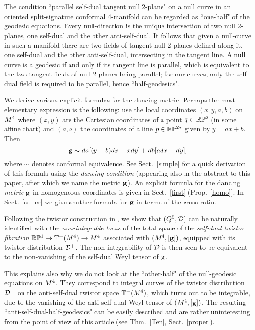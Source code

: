 The   condition ``parallel  self-dual tangent null 2-plane" on a null curve in an oriented  split-signature conformal 4-manifold can be regarded as ``one-half" of  the  geodesic equations. Every null-direction  is the unique intersection of two null 2-planes, one self-dual and the other anti-self-dual. It follows that given a null-curve in such a manifold  there are  two fields of tangent null 2-planes defined along it, one self-dual and the other anti-self-dual, intersecting in the tangent line. A null  curve is a geodesic if and only if its tangent line is parallel, which  is equivalent to the two  tangent fields of null 2-planes being  parallel; for our curves, only the self-dual field   is required to be parallel, hence ``half-geodesics".  

We derive various explicit formulas for the dancing metric. Perhaps the most elementary expression is the following: use the local coordinates $(x,y,a,b)$ on $M^4$ where  $(x,y)$ are the Cartesian coordinates of a point $q\in\mathbb{R}\mathbb{P}^2$ (in some affine chart) and  $(a,b)$ the coordinates of a line $p\in\mathbb{R}\mathbb{P}^{2*}$ given by $y=ax+b$. Then 
$$\mathbf{ g}\sim  da[(y - b)dx - xdy] + db[adx - dy],$$
where $\sim$ denotes conformal equivalence. See 
Sect.~\ref{simple} for a quick derivation of this formula using the {\em dancing condition} (appearing also in the abstract to this paper, after which we name  the metric $\mathbf{ g}$). An  explicit formula for the dancing {\em metric} $\mathbf{ g}$ in  homogeneous coordinates  is given  in  Sect.~\ref{first} (Prop.~\ref{homo}). In Sect.~\ref{ss_cr} we give another formula for $\mathbf{ g}$ in terms of  the cross-ratio. 



Following the twistor construction in  \cite{AN}, we show that  $(Q^5, {\mathcal D})$ can  be naturally identified with the {\em non-integrable locus} of  the  total space of the {\em self-dual twistor fibration} $\mathbb{R}\mathbb{P}^1\to \mathbb{T}^+(M^4)\to M^4$ associated with $(M^4,[\mathbf{ g}])$, equipped with its twistor distribution ${\mathcal D}^+$. The non-integrability of ${\mathcal D}$ is then seen to be equivalent to the non-vanishing of the self-dual Weyl tensor of $\mathbf{ g}$.

This explains also why we do not look at the ``other-half" of the null-geodesic equations on $M^4$. They correspond to integral curves of the twistor distribution ${\mathcal D}^-$ on the anti-self-dual twistor space $\mathbb{T}^-(M^4)$, which turns out to be integrable, due to the vanishing of the anti-self-dual Weyl tensor of $(M^4,[\mathbf{ g}])$. The resulting ``anti-self-dual-half-geodesics" can be easily described and are rather uninteresting from the point of view of this article (see Thm.~\ref{Ten}, Sect.~\ref{proper}). 



